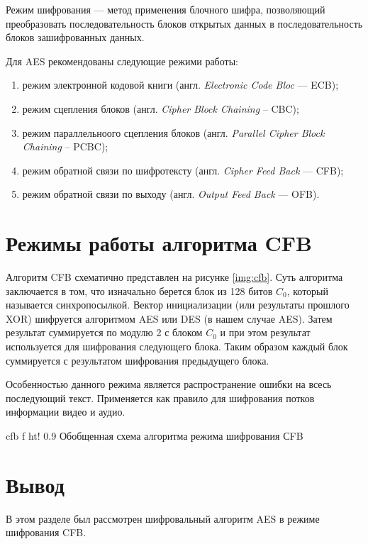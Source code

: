 Режим шифрования --- метод применения блочного шифра, позволяющий преобразовать последовательность блоков открытых данных в последовательность блоков зашифрованных данных.

Для AES рекомендованы следующие режими работы:
\begin{enumerate}[label=\arabic*)]
	\item режим электронной кодовой книги (англ. \textit{Electronic Code Bloc} --- ECB);
	\item режим сцепления блоков (англ. \textit{Cipher Block Chaining} -- CBC);
	\item режим параллельноого сцепления блоков (англ. \textit{Parallel Cipher Block Chaining} -- PCBC);
	\item режим обратной связи по шифротексту (англ. \textit{Cipher Feed Back} --- CFB);
	\item режим обратной связи по выходу (англ. \textit{Output Feed Back} --- OFB).
\end{enumerate}

\section{Режимы работы алгоритма CFB}

Алгоритм CFB схематично представлен на рисунке \ref{img:cfb}.
Суть алгоритма заключается в том, что изначально берется блок из 128 битов $C_0$, который называется синхропосылкой. 
Вектор инициализации (или результаты прошлого XOR) шифруется алгоритмом AES или DES (в нашем случае AES). 
Затем результат суммируется по модулю 2 с блоком \(C_0\) и при этом результат используется для шифрования следующего блока.
Таким образом каждый блок суммируется с результатом шифрования предыдущего блока.

Особенностью данного режима является распространение ошибки на всесь последующий текст.
Применяется как правило для шифрования потков информации видео и аудио.

{cfb} %
{f} %
{ht!} %
{0.9\textwidth} %
{Обобщенная схема алгоритма режима шифрования СFB} %



\section*{Вывод}

В этом разделе был рассмотрен шифровальный алгоритм AES в режиме шифрования CFB.